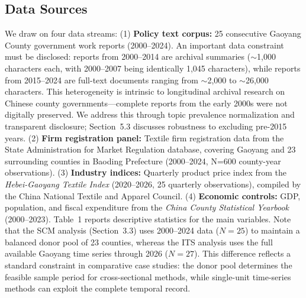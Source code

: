 \documentclass[sustainability,article,submit,moreauthors,pdftex]{mdpi}
\begin{document}
\subsection{Data Sources}
We draw on four data streams: (1) \textbf{Policy text corpus:} 25 consecutive Gaoyang County government work reports (2000--2024). An important data constraint must be disclosed: reports from 2000--2014 are archival summaries ($\sim$1,000 characters each, with 2000--2007 being identically 1,045 characters), while reports from 2015--2024 are full-text documents ranging from $\sim$2,000 to $\sim$26,000 characters. This heterogeneity is intrinsic to longitudinal archival research on Chinese county governments---complete reports from the early 2000s were not digitally preserved. We address this through topic prevalence normalization and transparent disclosure; Section~5.3 discusses robustness to excluding pre-2015 years. (2) \textbf{Firm registration panel:} Textile firm registration data from the State Administration for Market Regulation database, covering Gaoyang and 23 surrounding counties in Baoding Prefecture (2000--2024, N=600 county-year observations). (3) \textbf{Industry indices:} Quarterly product price index from the \emph{Hebei-Gaoyang Textile Index} (2020--2026, 25 quarterly observations), compiled by the China National Textile and Apparel Council. (4) \textbf{Economic controls:} GDP, population, and fiscal expenditure from the \emph{China County Statistical Yearbook} (2000--2023). Table~1 reports descriptive statistics for the main variables. Note that the SCM analysis (Section~3.3) uses 2000--2024 data ($N=25$) to maintain a balanced donor pool of 23 counties, whereas the ITS analysis uses the full available Gaoyang time series through 2026 ($N=27$). This difference reflects a standard constraint in comparative case studies: the donor pool determines the feasible sample period for cross-sectional methods, while single-unit time-series methods can exploit the complete temporal record.
\end{document}
